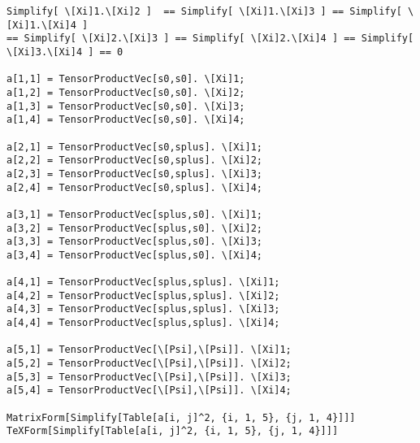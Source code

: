 \documentclass[%
 preprint,
 showpacs,
 showkeys,
 preprintnumbers,
 amsmath,amssymb,
 aps,
 pra,
  longbibliography,
 ]{revtex4-1}
\begin{document}
{\begin{verbatim}
Simplify[ \[Xi]1.\[Xi]2 ]  == Simplify[ \[Xi]1.\[Xi]3 ] == Simplify[ \[Xi]1.\[Xi]4 ]
== Simplify[ \[Xi]2.\[Xi]3 ] == Simplify[ \[Xi]2.\[Xi]4 ] == Simplify[ \[Xi]3.\[Xi]4 ] == 0

a[1,1] = TensorProductVec[s0,s0]. \[Xi]1;
a[1,2] = TensorProductVec[s0,s0]. \[Xi]2;
a[1,3] = TensorProductVec[s0,s0]. \[Xi]3;
a[1,4] = TensorProductVec[s0,s0]. \[Xi]4;

a[2,1] = TensorProductVec[s0,splus]. \[Xi]1;
a[2,2] = TensorProductVec[s0,splus]. \[Xi]2;
a[2,3] = TensorProductVec[s0,splus]. \[Xi]3;
a[2,4] = TensorProductVec[s0,splus]. \[Xi]4;

a[3,1] = TensorProductVec[splus,s0]. \[Xi]1;
a[3,2] = TensorProductVec[splus,s0]. \[Xi]2;
a[3,3] = TensorProductVec[splus,s0]. \[Xi]3;
a[3,4] = TensorProductVec[splus,s0]. \[Xi]4;

a[4,1] = TensorProductVec[splus,splus]. \[Xi]1;
a[4,2] = TensorProductVec[splus,splus]. \[Xi]2;
a[4,3] = TensorProductVec[splus,splus]. \[Xi]3;
a[4,4] = TensorProductVec[splus,splus]. \[Xi]4;

a[5,1] = TensorProductVec[\[Psi],\[Psi]]. \[Xi]1;
a[5,2] = TensorProductVec[\[Psi],\[Psi]]. \[Xi]2;
a[5,3] = TensorProductVec[\[Psi],\[Psi]]. \[Xi]3;
a[5,4] = TensorProductVec[\[Psi],\[Psi]]. \[Xi]4;

MatrixForm[Simplify[Table[a[i, j]^2, {i, 1, 5}, {j, 1, 4}]]]
TeXForm[Simplify[Table[a[i, j]^2, {i, 1, 5}, {j, 1, 4}]]]
\end{verbatim}

}


\end{document}

